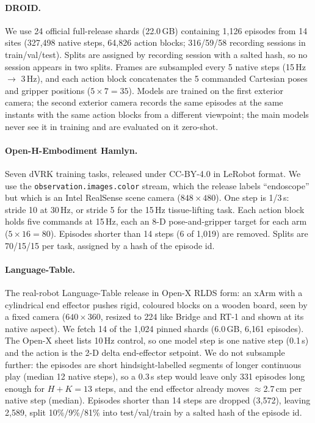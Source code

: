\paragraph{DROID.} We use 24 official full-release shards (22.0\,GB) containing 1{,}126 episodes from 14 sites (327{,}498 native steps, 64{,}826 action blocks; 316/59/58 recording
sessions in train/val/test). Splits are assigned by recording session with a salted hash, so no session appears in two
splits. Frames are subsampled every 5 native steps (15\,Hz $\to$ 3\,Hz), and each action block
concatenates the 5 commanded Cartesian poses and gripper positions ($5\times7{=}35$).
Models are trained on the first exterior camera; the second exterior camera records the same episodes at the same
instants with the same action blocks from a different viewpoint; the main models never see it in training and are
evaluated on it zero-shot.
\paragraph{Open-H-Embodiment Hamlyn.} Seven dVRK training tasks, released under CC-BY-4.0 in LeRobot
format. We use the \texttt{observation.images.color} stream, which the release labels ``endoscope''
but which is an Intel RealSense scene camera ($848{\times}480$). One step is 1/3\,s: stride 10 at
30\,Hz, or stride 5 for the 15\,Hz tissue-lifting task. Each action block holds five commands at
15\,Hz, each an 8-D pose-and-gripper target for each arm ($5\times16{=}80$). Episodes shorter than 14
steps (6 of 1{,}019) are removed. Splits are 70/15/15 per task, assigned by a hash of the episode id.
\paragraph{Language-Table.} The real-robot Language-Table release \citep{lynch2023interactive} in Open-X RLDS form:
an xArm with a cylindrical end effector pushes rigid, coloured blocks on a wooden board, seen by a fixed camera
($640{\times}360$, resized to 224 like Bridge and RT-1 and shown at its native aspect). We fetch 14 of the 1{,}024 pinned
shards (6.0\,GB, 6{,}161 episodes). The Open-X sheet lists 10\,Hz control, so one model step is one native step (0.1\,s)
and the action is the 2-D delta end-effector setpoint. We do not subsample further: the episodes are short
hindsight-labelled segments of longer continuous play (median 12 native steps), so a 0.3\,s step would leave only 331 episodes long enough for
$H{+}K{=}13$ steps, and the end effector already moves $\approx$2.7\,cm per native step (median). Episodes shorter than 14
steps are dropped (3{,}572), leaving 2{,}589, split 10\%/9\%/81\% into test/val/train by a salted hash of the episode id.

